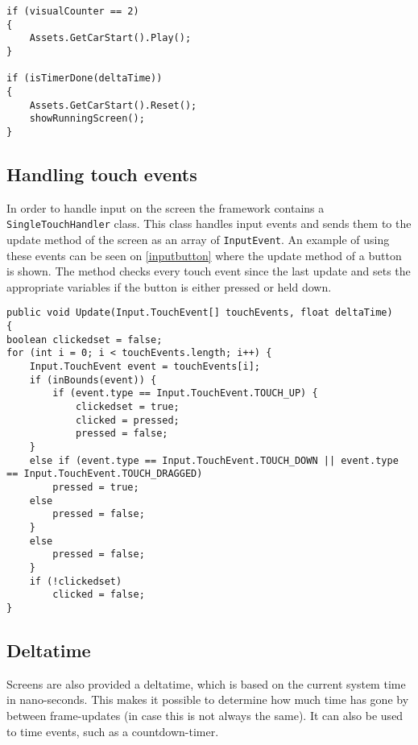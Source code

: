 \begin{lstlisting}[caption=Playing a sound, label=playsound]
if (visualCounter == 2) 
{
	Assets.GetCarStart().Play();
}

if (isTimerDone(deltaTime)) 
{
	Assets.GetCarStart().Reset();
	showRunningScreen();
}
\end{lstlisting}

\subsection{Handling touch events}
In order to handle input on the screen the framework contains a \lstinline|SingleTouchHandler| class.
This class handles input events and sends them to the update method of the screen as an array of \lstinline|InputEvent|.
An example of using these events can be seen on \cref{inputbutton} where the update method of a button is shown. 
The method checks every touch event since the last update and sets the appropriate variables if the button is either pressed or held down.

\begin{lstlisting}[caption=Implementation of an ingame button, label=inputbutton]
public void Update(Input.TouchEvent[] touchEvents, float deltaTime) 
{
boolean clickedset = false;
for (int i = 0; i < touchEvents.length; i++) {
	Input.TouchEvent event = touchEvents[i];
	if (inBounds(event)) {
		if (event.type == Input.TouchEvent.TOUCH_UP) {
			clickedset = true;
			clicked = pressed;
			pressed = false;
	}
	else if (event.type == Input.TouchEvent.TOUCH_DOWN || event.type == Input.TouchEvent.TOUCH_DRAGGED)
		pressed = true;
	else
		pressed = false;
	} 
	else
		pressed = false;
	}
	if (!clickedset)
		clicked = false;
}
\end{lstlisting}

\subsection{Deltatime}
Screens are also provided a deltatime, which is based on the current system time in nano-seconds.
This makes it possible to determine how much time has gone by between frame-updates (in case this is not always the same).
It can also be used to time events, such as a countdown-timer.